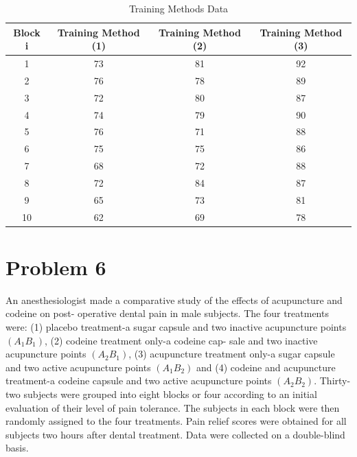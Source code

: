 \documentclass{article}
\begin{document}
\begin{table}[!ht]
	\centering
	\caption{Training Methods Data}
	\begin{tabular}{c c c c}
		\hline
		\textbf{Block i} & \textbf{Training Method (1)} & \textbf{Training Method (2)} & \textbf{Training Method (3)} \\
		\hline
		1                & 73                           & 81                           & 92                           \\
		2                & 76                           & 78                           & 89                           \\
		3                & 72                           & 80                           & 87                           \\
		4                & 74                           & 79                           & 90                           \\
		5                & 76                           & 71                           & 88                           \\
		6                & 75                           & 75                           & 86                           \\
		7                & 68                           & 72                           & 88                           \\
		8                & 72                           & 84                           & 87                           \\
		9                & 65                           & 73                           & 81                           \\
		10               & 62                           & 69                           & 78                           \\
		\hline
	\end{tabular}
\end{table}

\section{Problem 6}
An anesthesiologist made a comparative study of the effects of acupuncture and codeine on post-
operative dental pain in male subjects. The four treatments were: (1) placebo treatment-a sugar
capsule and two inactive acupuncture points $(A_1B_1)$, (2) codeine treatment only-a codeine cap-
sale and two inactive acupuncture points $(A_2B_1)$, (3) acupuncture treatment only-a sugar capsule
and two active acupuncture points $(A_1B_2)$ and (4) codeine and acupuncture treatment-a codeine
capsule and two active acupuncture points $(A_2B_2)$. Thirty-two subjects were grouped into eight
blocks or four according to an initial evaluation of their level of pain tolerance. The subjects in
each block were then randomly assigned to the four treatments. Pain relief scores were obtained
for all subjects two hours after dental treatment. Data were collected on a double-blind basis.
\end{document}
